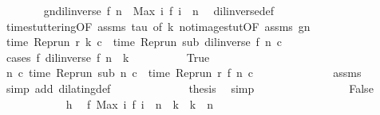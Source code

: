 \begin{isabellebody}
\isanewline
\ \ \ \ \ \ \isamarkupfalse%
\ gn{\isacharcolon}{\isacartoucheopen}{\isacharparenleft}dil{\isacharunderscore}inverse\ f{\isacharparenright}\ n\ {\isacharequal}\ Max\ {\isacharbraceleft}i{\isachardot}\ f\ i\ {\isasymle}\ n{\isacharbraceright}{\isacartoucheclose}\ \isamarkupfalse%
\ dil{\isacharunderscore}inverse{\isacharunderscore}def\ \isacommand{{\isachardot}{\isachardot}}\isamarkupfalse%
\isanewline
\ \ \ \ \ \ \isamarkupfalse%
\ time{\isacharunderscore}stuttering{\isacharbrackleft}OF\ assms\ tau{\isacharcomma}\ of\ k{\isacharbrackright}\ not{\isacharunderscore}image{\isacharunderscore}stut{\isacharbrackleft}OF\ assms\ gn{\isacharbrackright}\isanewline
\ \ \ \ \ \ \isamarkupfalse%
\ {\isacartoucheopen}time\ {\isacharparenleft}{\isacharparenleft}Rep{\isacharunderscore}run\ r{\isacharparenright}\ k\ c{\isacharparenright}\ {\isacharequal}\ time\ {\isacharparenleft}{\isacharparenleft}Rep{\isacharunderscore}run\ sub{\isacharparenright}\ {\isacharparenleft}{\isacharparenleft}dil{\isacharunderscore}inverse\ f{\isacharparenright}\ n{\isacharparenright}\ c{\isacharparenright}{\isacartoucheclose}\isanewline
\ \ \ \ \ \ \isamarkupfalse%
\ {\isacharparenleft}cases\ {\isacartoucheopen}f\ {\isacharparenleft}{\isacharparenleft}dil{\isacharunderscore}inverse\ f{\isacharparenright}\ n{\isacharparenright}\ {\isacharequal}\ k{\isacartoucheclose}{\isacharparenright}\isanewline
\ \ \ \ \ \ \ \ \isamarkupfalse%
\ True\isanewline
\ \ \ \ \ \ \ \ \ \ \isamarkupfalse%
\ \isamarkupfalse%
\ {\isacartoucheopen}{\isasymforall}n\ c{\isachardot}\ time\ {\isacharparenleft}Rep{\isacharunderscore}run\ sub\ n\ c{\isacharparenright}\ {\isacharequal}\ time\ {\isacharparenleft}Rep{\isacharunderscore}run\ r\ {\isacharparenleft}f\ n{\isacharparenright}\ c{\isacharparenright}{\isacartoucheclose}\isanewline
\ \ \ \ \ \ \ \ \ \ \ \ \isamarkupfalse%
\ assms\ \isamarkupfalse%
\ {\isacharparenleft}simp\ add{\isacharcolon}\ dilating{\isacharunderscore}def{\isacharparenright}\isanewline
\ \ \ \ \ \ \ \ \ \ \isamarkupfalse%
\ \isamarkupfalse%
\ {\isacharquery}thesis\ \isamarkupfalse%
\ simp\isanewline
\ \ \ \ \ \ \isamarkupfalse%
\isanewline
\ \ \ \ \ \ \ \ \isamarkupfalse%
\ False\isanewline
\ \ \ \ \ \ \ \ \ \ \isamarkupfalse%
\ h\ \isamarkupfalse%
\ {\isacartoucheopen}f\ {\isacharparenleft}Max\ {\isacharbraceleft}i{\isachardot}\ f\ i\ {\isasymle}\ n{\isacharbraceright}{\isacharparenright}\ {\isacharless}\ k\ {\isasymand}\ k\ {\isasymle}\ n{\isacartoucheclose}\ \isamarkupfalse%

\end{isabellebody}

